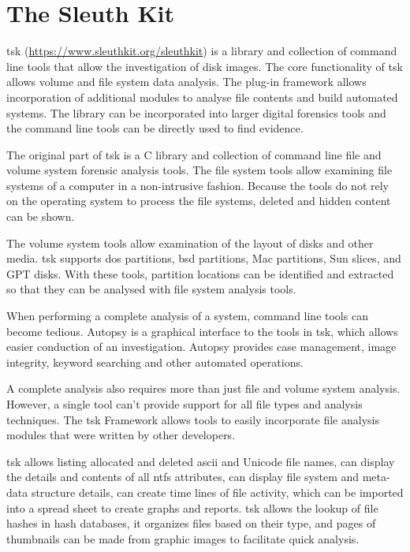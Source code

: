 \section{The Sleuth Kit}

\acrshort{tsk} (\href{https://www.sleuthkit.org/sleuthkit}{https://www.sleuthkit.org/sleuthkit}) is a library and collection of command line tools that allow the
investigation of disk images. The core functionality of \acrshort{tsk} allows volume and file system data analysis.
The plug-in framework allows incorporation of additional modules to analyse file contents
and build automated systems. The library can be incorporated into larger digital forensics tools and
the command line tools can be directly used to find evidence.

The original part of \acrshort{tsk} is a C library and collection of command line
file and volume system forensic analysis tools. The file system tools allow examining file systems
of a computer in a non-intrusive fashion. Because the tools do not rely on the operating system to process
the file systems, deleted and hidden content can be shown.

The volume system tools allow examination of the layout of disks
and other media. \acrshort{tsk} supports \acrshort{dos} partitions, \acrshort{bsd} partitions, Mac partitions, Sun slices, and 
GPT disks. With these tools, partition locations can be identified 
and extracted so that they can be analysed with file system analysis tools.

When performing a complete analysis of a system, command line 
tools can become tedious. Autopsy is a graphical interface to the tools in \acrshort{tsk}, 
which allows easier conduction of an investigation. Autopsy 
provides case management, image integrity, keyword searching and other automated
operations.

A complete analysis also requires more than just file and volume system analysis.
However, a single tool can't provide support for all file types and analysis 
techniques. The \acrshort{tsk} Framework allows tools to easily incorporate file analysis
modules that were written by other developers.

\acrshort{tsk} allows listing allocated and deleted \acrshort{ascii} and Unicode file names, can display the
details and contents of all \acrshort{ntfs} attributes, can display file system and meta-data structure details,
can create time lines of file activity, which can be imported into a spread sheet to create graphs and reports.
\acrshort{tsk} allows the lookup of file hashes in hash databases, it organizes files based on their type, and pages of
thumbnails can be made from graphic images to facilitate quick analysis.

